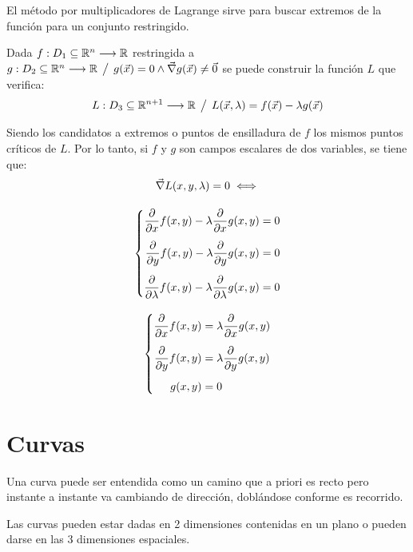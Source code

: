\documentclass[a5paper,12pt,twoside]{book}
\begin{document}
El método por multiplicadores de Lagrange sirve para buscar extremos de la función para un conjunto restringido.

Dada $f:D_1 \subseteq \mathbb{R}^n \longrightarrow \mathbb{R}$ restringida a $g:D_2 \subseteq \mathbb{R}^n \longrightarrow \mathbb{R} \hspace{1ex} \big/ \hspace{1ex} g(\Vec{x})=0 \land \Vec{\nabla} g(\Vec{x}) \neq \Vec{0}$ se puede construir la función $L$ que verifica:
\begin{equation*}
    L:D_3 \subseteq \mathbb{R}^{n+1} \longrightarrow \mathbb{R} \hspace{1ex} \big/ \hspace{1ex} L(\Vec{x}, \lambda) = f(\Vec{x}) - \lambda g(\Vec{x})
\end{equation*}

Siendo los candidatos a extremos o puntos de ensilladura de $f$ los mismos puntos críticos de $L$. Por lo tanto, si $f$ y $g$ son campos escalares de dos variables, se tiene que:
\begin{gather*}
    \Vec{\nabla} L(x,y,\lambda)=0 \iff
    \\[1em]
    \left\{
    \begin{aligned}
        \frac{\partial}{\partial x} f(x,y) - \lambda \frac{\partial}{\partial x} g(x,y) &= 0
        \\[1ex]
        \frac{\partial}{\partial y} f(x,y) - \lambda \frac{\partial}{\partial y} g(x,y) &= 0
        \\[1ex]
        \frac{\partial}{\partial \lambda} f(x,y) - \lambda \frac{\partial}{\partial \lambda} g(x,y) &= 0
    \end{aligned}
    \right.
    \\[1em]
    \left\{
    \begin{aligned}
        \frac{\partial}{\partial x} f(x,y) &= \lambda \frac{\partial}{\partial x} g(x,y)
        \\[1ex]
        \frac{\partial}{\partial y} f(x,y) &= \lambda \frac{\partial}{\partial y} g(x,y)
        \\[1ex]
        g(x,y) &= 0
    \end{aligned}
    \right.
\end{gather*}


\chapter{Curvas}


Una curva puede ser entendida como un camino que a priori es recto pero instante a instante va cambiando de dirección, doblándose conforme es recorrido.

Las curvas pueden estar dadas en 2 dimensiones contenidas en un plano o pueden darse en las 3 dimensiones espaciales.
\end{document}
